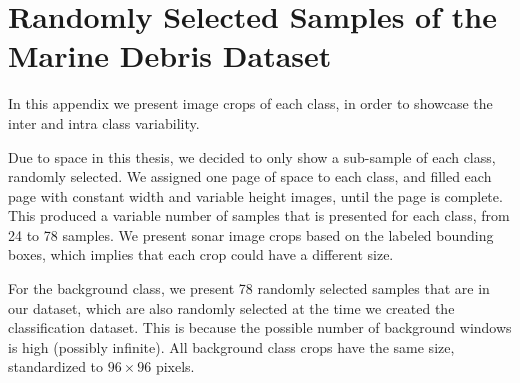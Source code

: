 \chapter[Randomly Selected Samples of the\\ Marine Debris Dataset]{Randomly Selected Samples of the Marine Debris Dataset} 

In this appendix we present image crops of each class, in order to showcase the inter and intra class variability.

Due to space in this thesis, we decided to only show a sub-sample of each class, randomly selected. We assigned one page of space to each class, and filled each page with constant width and variable height images, until the page is complete. This produced a variable number of samples that is presented for each class, from 24 to 78 samples. We present sonar image crops based on the labeled bounding boxes, which implies that each crop could have a different size. 

For the background class, we present 78 randomly selected samples that are in our dataset, which are also randomly selected at the time we created the classification dataset. This is because the possible number of background windows is high (possibly infinite). All background class crops have the same size, standardized to $96 \times 96$ pixels.

